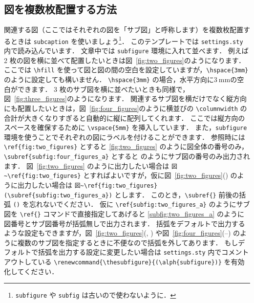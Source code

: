 \subsection{図を複数枚配置する方法}
\label{ssec:multiple}

関連する図（ここではそれぞれの図を「サブ図」と呼称します）を複数枚配置するときは \verb|subcaption| を使いましょう\footnote{\texttt{subfigure} や \texttt{subfig} は古いので使わないように．}．
このテンプレートでは \verb|settings.sty| 内で読み込んでいます．
文章中では \verb|subfigure| 環境に入れて並べます．
例えば 2 枚の図を横に並べて配置したいときは図~\ref{fig:two_figures}のようになります．
ここでは \verb|\hfill| を使って図と図の間の空白を設定していますが，\verb|\hspace{3mm}| のように設定しても構いません．
\verb|\hspace{3mm}| の場合，水平方向に$\SI{3}{\milli\meter}$の空白ができます．
3 枚のサブ図を横に並べたいときも同様で，図~\ref{fig:three_figures}のようになります．
関連するサブ図を横だけでなく縦方向にも配置したいときは，図~\ref{fig:four_figures}のように横並びの \verb|\columnwidth| の合計が大きくなりすぎると自動的に縦に配列してくれます．
ここでは縦方向のスペースを確保するために \verb|\vspace{5mm}| を挿入しています．
また，\verb|subfigure| 環境を使うことでそれぞれの図にラベルを付けることができます．
参照時には \verb|\ref{fig:two_figures}| とすると \ref{fig:two_figures} のように図全体の番号のみ，\verb|\subref{subfig:four_figures_a}| とすると  のようにサブ図の番号のみ出力されます．
図~\ref{fig:two_figures} のように出力したい場合は \verb|図~\ref{fig:two_figures}| とすればよいですが，仮に図~\ref{fig:two_figures}() のように出力したい場合は \verb|図~\ref{fig:two_figures}(\subref{subfig:two_figures_a})| とします．
このとき，\verb|\subref{}| 前後の括弧 \verb|()| を忘れないでください．
仮に \verb|\ref{subfig:two_figures_a}| のようにサブ図を \verb|\ref{}| コマンドで直接指定してあげると \ref{subfig:two_figures_a} のように図番号とサブ図番号が括弧無しで出力されます．
括弧をデフォルトで出力するような設定もできますが，図~\ref{fig:two_figures}(, ) や図~\ref{fig:four_figures}(--) のように複数のサブ図を指定するときに不便なので括弧を外してあります．
もしデフォルトで括弧を出力する設定に変更したい場合は \verb|settings.sty| 内でコメントアウトしている \verb|\renewcommand{\thesubfigure}{(\alph{subfigure})}| を有効化してください．

